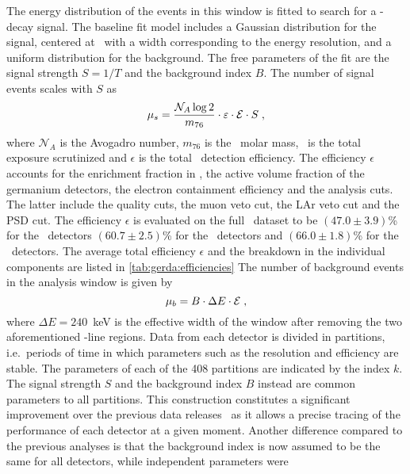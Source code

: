 The energy distribution of the events in this window is fitted to search for a \onbb-decay
signal. The baseline fit model includes a Gaussian distribution for the signal, centered
at \qbb\ with a width corresponding to the energy resolution, and a uniform distribution
for the background. The free parameters of the fit are the signal strength $S=1/T$ and the
background index $B$. The number of signal events scales with $S$ as
\begin{equation}\label{eq:gerda:mu_s}
  \mu_s = \frac{\mathcal{N}_A \log2}{m_{76}} \cdot \varepsilon \cdot \mathcal{E} \cdot S \;,
\end{equation}
where $\mathcal{N}_A$ is the Avogadro number, $m_{76}$ is the \gesix\ molar mass, \expo\
is the total exposure scrutinized and $\epsilon$ is the total \onbb\ detection efficiency.
The efficiency $\epsilon$ accounts for the enrichment fraction in \gesix, the active
volume fraction of the germanium detectors, the electron containment efficiency and the
analysis cuts. The latter include the quality cuts, the muon veto cut, the LAr veto cut
and the PSD cut. The efficiency $\epsilon$ is evaluated on the full \phasetwo\ dataset to
be $(47.0 \pm 3.9)$\% for the \scoax\ detectors $(60.7 \pm 2.5)$\% for the \bege\ detectors
and $(66.0 \pm 1.8)$\% for the \icoax\ detectors. The average total efficiency $\epsilon$
and the breakdown in the individual components are listed in \cref{tab:gerda:efficiencies}
The number of background events in the analysis window is given by
\begin{equation}\label{eq:gerda:mu_b}
  \mu_b = B \cdot \Delta{}E \cdot \mathcal{E} \;,
\end{equation}
where $\Delta{}E = 240$~keV is the effective width of the window after removing the two
aforementioned \g-line regions.
\newpar
Data from each detector is divided in partitions, i.e.~periods of time in which parameters
such as the resolution and efficiency are stable. The parameters of each of the 408
partitions are indicated by the index $k$. The signal strength $S$ and the background
index $B$ instead are common parameters to all partitions. This construction constitutes a
significant improvement over the previous data releases~\cite{Agostini2019a, Agostini2018,
Agostini2017} as it allows a precise tracing of the performance of each detector at a
given moment. Another difference compared to the previous analyses is that the background
index is now assumed to be the same for all detectors, while independent parameters were
